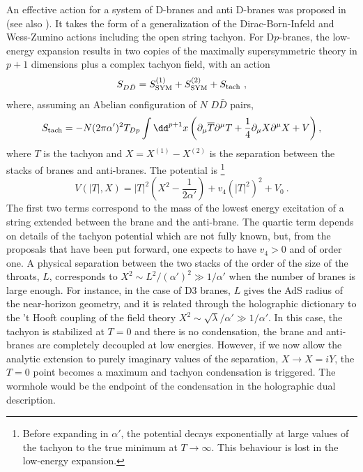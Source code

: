 An effective action for a system of D-branes and anti D-branes was proposed in \cite{Sen:2003tm,Garousi:2004rd} (see also \cite{Kraus:2000nj,Takayanagi:2000rz,Jones:2002sia,Jatkar:2000ei,Hikida:2000cp}). It takes the form of a generalization of the Dirac-Born-Infeld and Wess-Zumino actions including the open string tachyon. For D$p$-branes, the low-energy expansion results in two copies of the maximally supersymmetric theory in $p+1$ dimensions plus a complex tachyon field, with an action 
\begin{equation}
	S_{D\bar{D}}=S_{\text{SYM}}^{(1)}+S_{\text{SYM}}^{(2)}+S_{\rm tach}\ ,
\end{equation}
where, assuming an Abelian configuration of $N$ $D\bar{D}$ pairs,
\begin{equation}
	S_{\rm tach}=-N(2\pi \alpha')^2T_{Dp}\int \dd^{p+1}x \left(\partial_\mu\overline{T}\partial^\mu T+\frac{1}{4}\partial_\mu X\partial^\mu X+V\right),
\end{equation}
where $T$ is the tachyon and $X=X^{(1)}-X^{(2)}$ is the separation between the stacks of branes and anti-branes. The potential is%
\footnote{Before expanding in $\alpha'$, the potential decays exponentially at large values of the tachyon to the true minimum at $T\to \infty$. This behaviour is lost in the low-energy expansion.}
\begin{equation}
	V(|T|,X)=|T|^2\left( X^2-\frac{1}{2\alpha'}\right)+v_4 (|T|^2)^2+V_0\ .
\end{equation}
The first two terms correspond to the mass of the lowest energy excitation of a string extended between the brane and the anti-brane. The quartic term depends on details of the tachyon potential which are not fully known, but, from the proposals that have been put forward, one expects to have $v_4>0$ and of order one. A physical separation between the two stacks of the order of the size of the throats, $L$, corresponds to $X^2\sim L^2/(\alpha')^2\gg 1/\alpha'$ when the number of branes is large enough. For instance, in the case of D3 branes, $L$ gives the AdS radius of the near-horizon geometry, and it is related through the holographic dictionary to the 't Hooft coupling of the field theory $X^2\sim \sqrt{\lambda}/\alpha'\gg 1/\alpha'$. In this case, the tachyon is stabilized at $T=0$ and there is no condensation, the brane and anti-branes are completely decoupled at low energies. However, if we now allow the analytic extension to purely imaginary values of the separation, $X\to X=i Y$, the $T=0$ point becomes a maximum and tachyon condensation is triggered. The wormhole would be the endpoint of the condensation in the holographic dual description.

